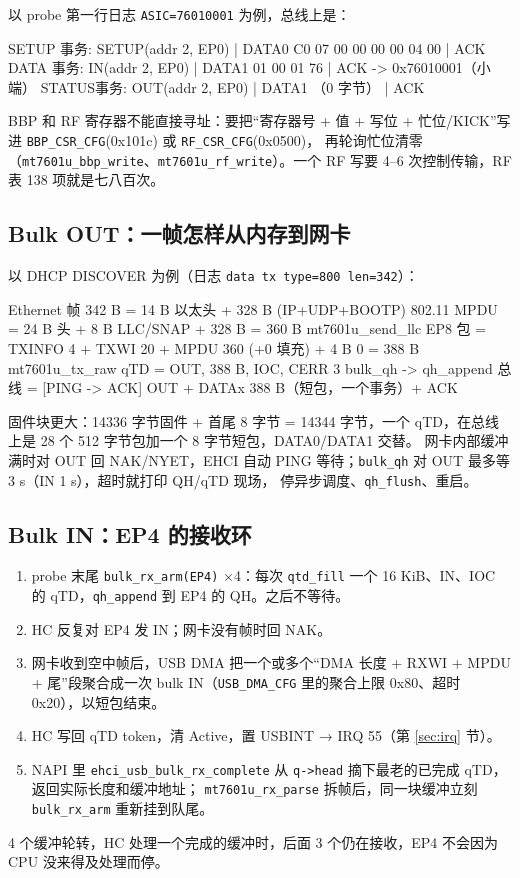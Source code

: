 \documentclass[UTF8,zihao=-4,fontset=none]{ctexart}
\newcommand{\fn}[1]{\texttt{#1}}
\begin{document}
以 probe 第一行日志 \fn{ASIC=76010001} 为例，总线上是：
\begin{code}
SETUP 事务:  SETUP(addr 2, EP0) | DATA0 C0 07 00 00 00 00 04 00 | ACK
DATA  事务:  IN(addr 2, EP0)    | DATA1 01 00 01 76             | ACK     -> 0x76010001（小端）
STATUS事务:  OUT(addr 2, EP0)   | DATA1 （0 字节）              | ACK
\end{code}
BBP 和 RF 寄存器不能直接寻址：要把“寄存器号 + 值 + 写位 + 忙位/KICK”写进 \fn{BBP\_CSR\_CFG}(0x101c) 或 \fn{RF\_CSR\_CFG}(0x0500)，
再轮询忙位清零（\fn{mt7601u\_bbp\_write}、\fn{mt7601u\_rf\_write}）。一个 RF 写要 4--6 次控制传输，RF 表 138 项就是七八百次。

\subsection{Bulk OUT：一帧怎样从内存到网卡}

以 DHCP DISCOVER 为例（日志 \fn{data tx type=800 len=342}）：

\begin{code}
Ethernet 帧 342 B = 14 B 以太头 + 328 B (IP+UDP+BOOTP)
802.11 MPDU = 24 B 头 + 8 B LLC/SNAP + 328 B = 360 B            mt7601u_send_llc
EP8 包     = TXINFO 4 + TXWI 20 + MPDU 360 (+0 填充) + 4 B 0 = 388 B   mt7601u_tx_raw
qTD        = OUT, 388 B, IOC, CERR 3                            bulk_qh -> qh_append
总线       = [PING -> ACK] OUT + DATAx 388 B（短包，一个事务）+ ACK
\end{code}

固件块更大：14336 字节固件 + 首尾 8 字节 = 14344 字节，一个 qTD，在总线上是 28 个 512 字节包加一个 8 字节短包，DATA0/DATA1 交替。
网卡内部缓冲满时对 OUT 回 NAK/NYET，EHCI 自动 PING 等待；\fn{bulk\_qh} 对 OUT 最多等 3 s（IN 1 s），超时就打印 QH/qTD 现场，
停异步调度、\fn{qh\_flush}、重启。

\subsection{Bulk IN：EP4 的接收环}

\begin{enumerate}[leftmargin=2em,itemsep=0pt]
\item probe 末尾 \fn{bulk\_rx\_arm(EP4)} ×4：每次 \fn{qtd\_fill} 一个 16 KiB、IN、IOC 的 qTD，\fn{qh\_append} 到 EP4 的 QH。之后不等待。
\item HC 反复对 EP4 发 IN；网卡没有帧时回 NAK。
\item 网卡收到空中帧后，USB DMA 把一个或多个“DMA 长度 + RXWI + MPDU + 尾”段聚合成一次 bulk IN（\fn{USB\_DMA\_CFG} 里的聚合上限 0x80、超时 0x20），以短包结束。
\item HC 写回 qTD token，清 Active，置 USBINT → IRQ 55（第 \ref{sec:irq} 节）。
\item NAPI 里 \fn{ehci\_usb\_bulk\_rx\_complete} 从 \fn{q->head} 摘下最老的已完成 qTD，返回实际长度和缓冲地址；
  \fn{mt7601u\_rx\_parse} 拆帧后，同一块缓冲立刻 \fn{bulk\_rx\_arm} 重新挂到队尾。
\end{enumerate}
4 个缓冲轮转，HC 处理一个完成的缓冲时，后面 3 个仍在接收，EP4 不会因为 CPU 没来得及处理而停。
\end{document}
